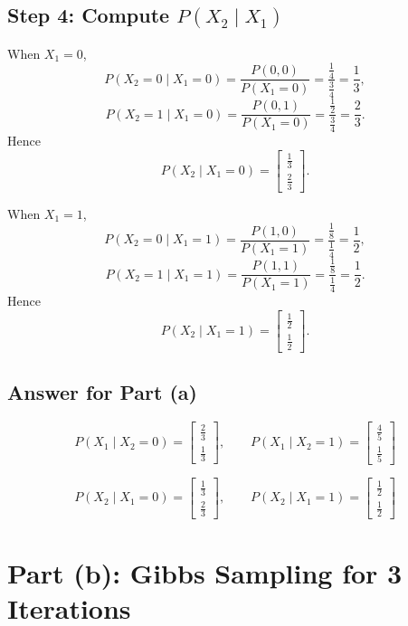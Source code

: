 \documentclass[11pt]{article}
\begin{document}
\subsection*{Step 4: Compute \(P(X_2\mid X_1)\)}

When \(X_1=0\),
\[
    P(X_2=0\mid X_1=0)=\frac{P(0,0)}{P(X_1=0)}=\frac{\frac14}{\frac34}=\frac13,
\]
\[
    P(X_2=1\mid X_1=0)=\frac{P(0,1)}{P(X_1=0)}=\frac{\frac12}{\frac34}=\frac23.
\]
Hence
\[
    P(X_2\mid X_1=0)
    =
    \begin{bmatrix}
        \frac13\\[4pt]
        \frac23
    \end{bmatrix}.
\]

When \(X_1=1\),
\[
    P(X_2=0\mid X_1=1)=\frac{P(1,0)}{P(X_1=1)}=\frac{\frac18}{\frac14}=\frac12,
\]
\[
    P(X_2=1\mid X_1=1)=\frac{P(1,1)}{P(X_1=1)}=\frac{\frac18}{\frac14}=\frac12.
\]
Hence
\[
    P(X_2\mid X_1=1)
    =
    \begin{bmatrix}
        \frac12\\[4pt]
        \frac12
    \end{bmatrix}.
\]

\subsection*{Answer for Part (a)}

\[
    \boxed{
    P(X_1\mid X_2=0)=
    \begin{bmatrix}
        \frac23\\[4pt]
        \frac13
    \end{bmatrix},
    \qquad
    P(X_1\mid X_2=1)=
    \begin{bmatrix}
        \frac45\\[4pt]
        \frac15
    \end{bmatrix}
    }
\]

\[
    \boxed{
    P(X_2\mid X_1=0)=
    \begin{bmatrix}
        \frac13\\[4pt]
        \frac23
    \end{bmatrix},
    \qquad
    P(X_2\mid X_1=1)=
    \begin{bmatrix}
        \frac12\\[4pt]
        \frac12
    \end{bmatrix}
    }
\]

\section*{Part (b): Gibbs Sampling for 3 Iterations}
\end{document}
